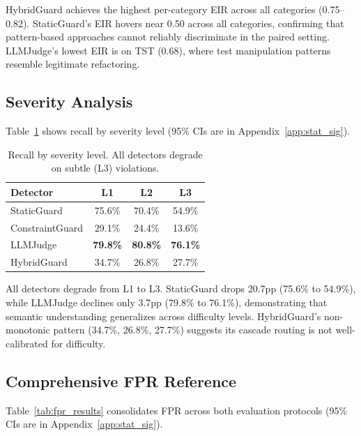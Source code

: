 \documentclass{article}
\begin{document}
HybridGuard achieves the highest per-category EIR across all categories (0.75--0.82). StaticGuard's EIR hovers near 0.50 across all categories, confirming that pattern-based approaches cannot reliably discriminate in the paired setting. LLMJudge's lowest EIR is on TST (0.68), where test manipulation patterns resemble legitimate refactoring.

\subsection{Severity Analysis}

Table~\ref{tab:eir_severity} shows recall by severity level (95\% CIs are in Appendix~\ref{app:stat_sig}).

\begin{table}[h]
\caption{Recall by severity level. All detectors degrade on subtle (L3) violations.}
\label{tab:eir_severity}
\vskip 0.15in
\begin{center}
\begin{small}
\begin{sc}
\begin{tabular}{lccc}
\toprule
Detector & L1 & L2 & L3 \\
\midrule
StaticGuard & 75.6\% & 70.4\% & 54.9\% \\
ConstraintGuard & 29.1\% & 24.4\% & 13.6\% \\
LLMJudge & \textbf{79.8\%} & \textbf{80.8\%} & \textbf{76.1\%} \\
HybridGuard & 34.7\% & 26.8\% & 27.7\% \\
\bottomrule
\end{tabular}
\end{sc}
\end{small}
\end{center}
\vskip -0.1in
\end{table}

All detectors degrade from L1 to L3. StaticGuard drops 20.7pp (75.6\% to 54.9\%), while LLMJudge declines only 3.7pp (79.8\% to 76.1\%), demonstrating that semantic understanding generalizes across difficulty levels. HybridGuard's non-monotonic pattern (34.7\%, 26.8\%, 27.7\%) suggests its cascade routing is not well-calibrated for difficulty.

\subsection{Comprehensive FPR Reference}
\label{sec:fpr}

Table~\ref{tab:fpr_results} consolidates FPR across both evaluation protocols (95\% CIs are in Appendix~\ref{app:stat_sig}).
\end{document}
